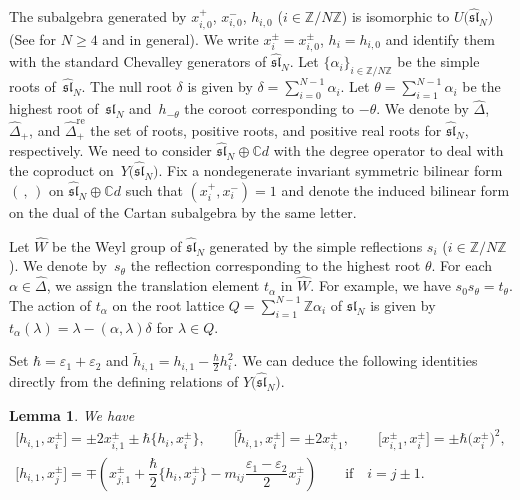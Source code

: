 \documentclass[11pt]{article}
\newtheorem{lem}[thm]{Lemma}
\theoremstyle{definition}
\numberwithin{equation}{section}
\newcommand{\ve}{\varepsilon}
\newcommand{\bbZ}{\mathbb{Z}}
\newcommand{\bbC}{\mathbb{C}}
\newcommand{\affY}{Y\big(\affsl\big)}
\newcommand{\affsl}{\hat{\mathfrak{sl}}_N}
\begin{document}
The subalgebra generated by $x_{i,0}^+$, $x_{i,0}^-$, $h_{i,0}$ ($i \in \bbZ / N\bbZ$) is isomorphic to $U\big(\affsl\big)$ (See \cite[Theorem~6.1]{MR2323534} for $N \geq 4$ and \cite[Theorem~6.9]{GRW} in general). We write $x_{i}^{\pm} = x_{i,0}^{\pm}$, $h_{i} = h_{i,0}$ and identify them with the standard Chevalley generators of $\affsl$. Let $\{\alpha_i\}_{i \in \bbZ/N\bbZ}$ be the simple roots of~$\affsl$. The null root $\delta$ is given by $\delta=\sum\limits_{i=0}^{N-1} \alpha_i$. Let $\theta = \sum\limits_{i=1}^{N-1} \alpha_i$ be the highest root of~$\mathfrak{sl}_N$ and~$h_{-\theta}$ the coroot corresponding to $-\theta$. We denote by $\hat{\Delta}$, $\hat{\Delta}_+$, and $\hat{\Delta}_+^{\mathrm{re}}$ the set of roots, positive roots, and positive real roots for $\affsl$, respectively. We need to consider $\affsl \oplus \bbC d$ with the degree operator to deal with the coproduct on~$\affY$. Fix a nondegenerate invariant symmetric bilinear form $(\, ,\, )$ on $\affsl \oplus \bbC d$ such that $(x_i^+,x_i^-)=1$ and denote the induced bilinear form on the dual of the Cartan subalgebra by the same letter.

Let $\hat{W}$ be the Weyl group of $\affsl$ generated by the simple reflections $s_i$ ($i \in \bbZ/N\bbZ$). We denote by~$s_{\theta}$ the reflection corresponding to the highest root $\theta$. For each $\alpha \in \hat{\Delta}$, we assign the translation element $t_{\alpha}$ in $\hat{W}$. For example, we have $s_0 s_{\theta} = t_{\theta}$. The action of $t_{\alpha}$ on the root lattice $Q=\sum\limits_{i=1}^{N-1} \bbZ \alpha_i$ of $\mathfrak{sl}_N$ is given by $t_{\alpha}(\lambda) = \lambda - (\alpha,\lambda)\delta$ for $\lambda \in Q$.

Set $\hbar = \ve_1 + \ve_2$ and $\tilde{h}_{i,1} = h_{i,1} - \frac{\hbar}{2} h_{i}^2$. We can deduce the following identities directly from the defining relations of $\affY$.
\begin{lem}\label{lem:relations}
We have
\begin{gather*}
\big[h_{i,1}, x_{i}^{\pm}\big] = \pm2 x_{i,1}^{\pm} \pm \hbar \big\{h_i,x_i^{\pm}\big\}, \qquad \big[\tilde{h}_{i,1}, x_{i}^{\pm}\big] = \pm2 x_{i,1}^{\pm}, \qquad \big[x_{i,1}^{\pm},x_i^{\pm}\big] = \pm \hbar \big(x_i^{\pm}\big)^2,\\
\big[h_{i,1}, x_{j}^{\pm}\big] = \mp \left( x_{j,1}^{\pm} + \dfrac{\hbar}{2} \big\{h_i,x_j^{\pm}\big\} - m_{ij} \dfrac{\ve_1-\ve_2}{2}x_j^{\pm} \right) \qquad \text{if} \quad i=j \pm 1.
\end{gather*}
\end{lem}
\end{document}
